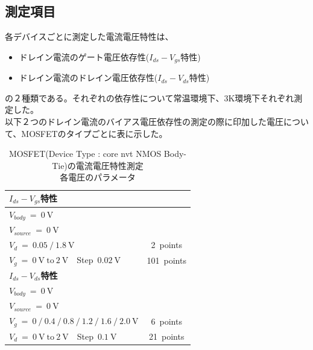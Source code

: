 		\subsection{測定項目}
			各デバイスごとに測定した電流電圧特性は、
			\begin{itemize}
				\item ドレイン電流のゲート電圧依存性($I_{ds}-V_{gs}$特性)
				\item ドレイン電流のドレイン電圧依存性($I_{ds}-V_{ds}$特性)
			\end{itemize}
			の２種類である。それぞれの依存性について常温環境下、3K環境下それぞれ測定した。\\
			以下２つのドレイン電流のバイアス電圧依存性の測定の際に印加した電圧について、MOSFETのタイプごとに表に示した。
			\begin{table}[htb]
				\begin{center}
					\begin{tabular}{| l c |} \hline \hline
						{\bf $I_{ds}-V_{gs}$特性} & \ \\ \hline
						$V_{body}\ =\  0\ \mathrm{V}$ & \ \\
						$V_{source}\ =\ 0\ \mathrm{V}$ & \ \\
						$V_{d}\ =\ 0.05\ /\ 1.8\ \mathrm{V}$ & 2\ points \\
						$V_{g}\ =\ 0\ \mathrm{V}\ \mathrm{to}\ 2\ \mathrm{V}$\ \ Step\ $0.02\ \mathrm{V}$ & 101\ points \\ \hline \hline
						{\bf $I_{ds}-V_{ds}$特性} & \ \\ \hline
						$V_{body}\ =\  0\ \mathrm{V}$ & \ \\
						$V_{source}\ =\ 0\ \mathrm{V}$ & \ \\
						$V_{g}\ =\ 0\ /\ 0.4\ /\ 0.8\ /\ 1.2\ /\ 1.6\ /\ 2.0\ \mathrm{V}$ & 6\ points \\
						$V_{d}\ =\ 0\ \mathrm{V}\ \mathrm{to}\ 2\ \mathrm{V}$\ \ Step\ $0.1\ \mathrm{V}$ & 21\ points \\ \hline
					\end{tabular}
					\caption{MOSFET(Device Type : core nvt NMOS Body-Tie)の電流電圧特性測定\\各電圧のパラメータ}
					\label{tab:NBT_bias}
				\end{center}
			\end{table}

